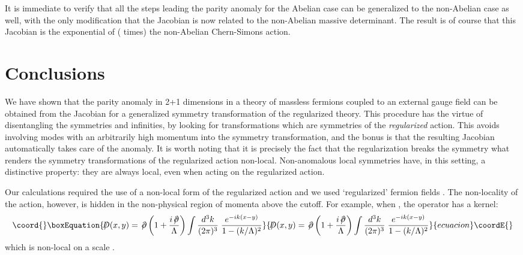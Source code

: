 \documentclass[a4paper,12pt]{article}
\providecommand{\spartial}{/\!\!\!\partial}
\providecommand{\Dslash}{/\!\!\!\!D}
\begin{document}
It is immediate to verify that all the steps leading the parity
anomaly for the Abelian case can be generalized to the non-Abelian
case as well, with the only modification that the Jacobian is now
related to the non-Abelian massive determinant.  The result is of
course that this Jacobian is the exponential of (\coordHE{} times) the
non-Abelian Chern-Simons action.


\section{Conclusions}\label{sec:concl}

We have shown that the parity anomaly in 2+1 dimensions in a theory of
massless fermions coupled to an external gauge field can be obtained
from the Jacobian for a generalized symmetry transformation of the
regularized theory. This procedure has the virtue of disentangling the
symmetries and infinities, by looking for transformations which are
symmetries of the {\em regularized\/} action. This avoids involving
modes with an arbitrarily high momentum into the symmetry
transformation, and the bonus is that the resulting Jacobian
automatically takes care of the anomaly. It is worth noting that it is
precisely the fact that the regularization breaks the symmetry what
renders the symmetry transformations of the regularized action
non-local.  Non-anomalous local symmetries have, in this setting, a
distinctive property: they are always local, even when acting on the
regularized action.


Our calculations required the use of a non-local form of the
regularized action and we used `regularized' fermion fields \myHighlight{$\Psi$}\coordHE{}.
The non-locality of the action, however, is hidden in the non-physical
region of momenta above the cutoff. For example, when \coordHE{}, the
\coordHE{} operator has a kernel:
\begin{equation}\coord{}\boxEquation{
\Dslash(x,y) = \,\spartial \left( 1+\frac{i\,\spartial}{\Lambda}
\right) \int \frac{d^3k}{(2\pi)^3} \;
\frac{e^{-ik(x-y)}}{1-(k/\Lambda)^2}
}{
\Dslash(x,y) = \,\spartial \left( 1+\frac{i\,\spartial}{\Lambda}
\right) \int \frac{d^3k}{(2\pi)^3} \;
\frac{e^{-ik(x-y)}}{1-(k/\Lambda)^2}
}{ecuacion}\coordE{}\end{equation}
which is non-local on a scale \coordHE{}.
\end{document}

